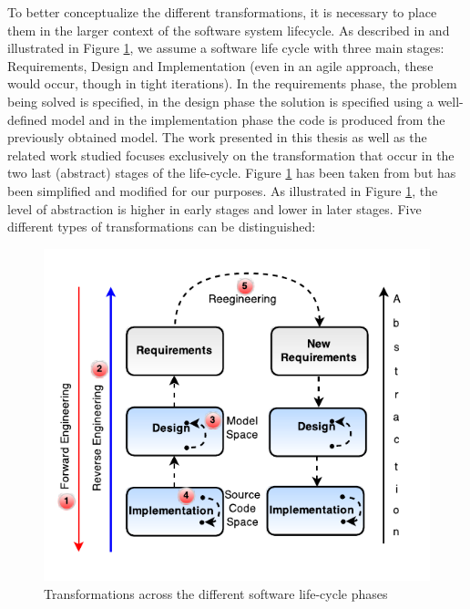 To better conceptualize the different transformations, it is necessary to place them in the larger context of the software system lifecycle. As described in \cite{Chikofsky} and illustrated in Figure \ref{fig:reveng}, we assume a software life cycle with three main stages: Requirements, Design and Implementation (even in an agile approach, these would occur, though in tight iterations). In the requirements phase, the problem being solved is specified, in the design phase the solution is specified using a well-defined model and in the implementation phase the code is produced from the previously obtained model. The work presented in this thesis as well as the related work studied focuses exclusively on the transformation that occur in the two last (abstract) stages of the life-cycle. Figure \ref{fig:reveng} has been taken from \cite{Chikofsky} but has been simplified and modified for our purposes. As illustrated in Figure \ref{fig:reveng}, the level of abstraction is higher in early stages and lower in later stages. Five different types of transformations can be distinguished:

\begin{figure}[h]
\centering
\includegraphics{Figures/transformationsRE}
\caption{Transformations across the different software life-cycle phases}
\label{fig:reveng}
\end{figure}

